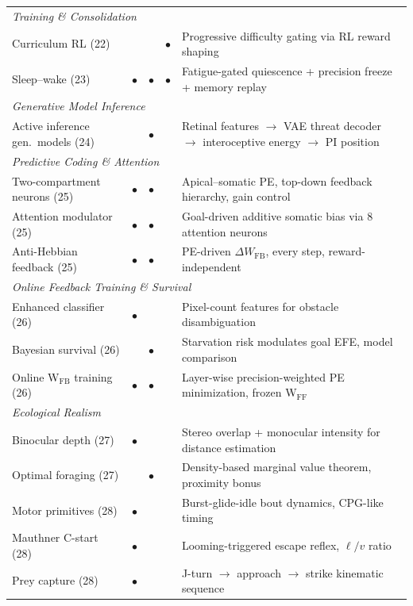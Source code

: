 \documentclass[11pt,a4paper]{article}
\begin{document}
\begin{table}[H]
\begin{tabular}{lcccp{5.8cm}}
\midrule
\multicolumn{5}{l}{\textit{Training \& Consolidation}} \\
Curriculum RL (22)             &           &           & $\bullet$ & Progressive difficulty gating via RL reward shaping \\
Sleep--wake (23)               & $\bullet$ & $\bullet$ & $\bullet$ & Fatigue-gated quiescence + precision freeze + memory replay \\
\midrule
\multicolumn{5}{l}{\textit{Generative Model Inference}} \\
Active inference gen.\ models (24) &           & $\bullet$ &           & Retinal features $\to$ VAE threat decoder $\to$ interoceptive energy $\to$ PI position \\
\midrule
\multicolumn{5}{l}{\textit{Predictive Coding \& Attention}} \\
Two-compartment neurons (25)       & $\bullet$ & $\bullet$ &           & Apical--somatic PE, top-down feedback hierarchy, gain control \\
Attention modulator (25)           & $\bullet$ & $\bullet$ &           & Goal-driven additive somatic bias via 8 attention neurons \\
Anti-Hebbian feedback (25)         & $\bullet$ & $\bullet$ &           & PE-driven $\Delta W_\text{FB}$, every step, reward-independent \\
\midrule
\multicolumn{5}{l}{\textit{Online Feedback Training \& Survival}} \\
Enhanced classifier (26)           & $\bullet$ &           &           & Pixel-count features for obstacle disambiguation \\
Bayesian survival (26)             &           & $\bullet$ &           & Starvation risk modulates goal EFE, model comparison \\
Online W$_\text{FB}$ training (26) & $\bullet$ & $\bullet$ &           & Layer-wise precision-weighted PE minimization, frozen W$_\text{FF}$ \\
\midrule
\multicolumn{5}{l}{\textit{Ecological Realism}} \\
Binocular depth (27)              & $\bullet$ &           &           & Stereo overlap + monocular intensity for distance estimation \\
Optimal foraging (27)             &           & $\bullet$ &           & Density-based marginal value theorem, proximity bonus \\
Motor primitives (28)             & $\bullet$ &           &           & Burst-glide-idle bout dynamics, CPG-like timing \\
Mauthner C-start (28)             & $\bullet$ &           &           & Looming-triggered escape reflex, $\ell/v$ ratio \\
Prey capture (28)                 & $\bullet$ &           &           & J-turn $\to$ approach $\to$ strike kinematic sequence \\
\bottomrule
\end{tabular}
\end{table}
\end{document}
